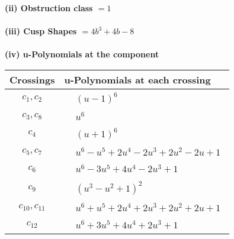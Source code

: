 \documentclass[1p]{elsarticle_modified}
\theoremstyle{definition}
\begin{document}
\flushleft \textbf{(ii) Obstruction class $= 1$}\\~\\
\flushleft \textbf{(iii) Cusp Shapes $= 4 b^3+4 b-8$}\\~\\
\newpage\renewcommand{\arraystretch}{1}
\flushleft \textbf{(iv) u-Polynomials at the component}\newline \\
\begin{tabular}{m{50pt}|m{274pt}}
Crossings & \hspace{64pt}u-Polynomials at each crossing \\
\hline $$\begin{aligned}c_{1},c_{2}\end{aligned}$$&$\begin{aligned}
&(u-1)^6
\end{aligned}$\\
\hline $$\begin{aligned}c_{3},c_{8}\end{aligned}$$&$\begin{aligned}
&u^6
\end{aligned}$\\
\hline $$\begin{aligned}c_{4}\end{aligned}$$&$\begin{aligned}
&(u+1)^6
\end{aligned}$\\
\hline $$\begin{aligned}c_{5},c_{7}\end{aligned}$$&$\begin{aligned}
&u^6- u^5+2 u^4-2 u^3+2 u^2-2 u+1
\end{aligned}$\\
\hline $$\begin{aligned}c_{6}\end{aligned}$$&$\begin{aligned}
&u^6-3 u^5+4 u^4-2 u^3+1
\end{aligned}$\\
\hline $$\begin{aligned}c_{9}\end{aligned}$$&$\begin{aligned}
&(u^3- u^2+1)^2
\end{aligned}$\\
\hline $$\begin{aligned}c_{10},c_{11}\end{aligned}$$&$\begin{aligned}
&u^6+u^5+2 u^4+2 u^3+2 u^2+2 u+1
\end{aligned}$\\
\hline $$\begin{aligned}c_{12}\end{aligned}$$&$\begin{aligned}
&u^6+3 u^5+4 u^4+2 u^3+1
\end{aligned}$\\
\hline
\end{tabular}\\~\\
\end{document}
